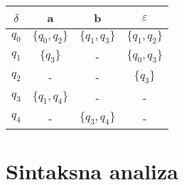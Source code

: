 \documentclass[times, 12pt, utf8]{book}
\begin{document}
\begin{enumerate}[resume]
\begin{tabular}{|c|c|c|c|} \hline

\(\delta\) & a & b & \(\varepsilon\) \\ \hline
\(q_{0}\) & \(\{q_{0}, q_{2}\}\) & \(\{q_{1}, q_{3}\}\) & \(\{q_{1}, q_{2}\}\) \\ \hline
\(q_{1}\) & \(\{q_{3}\}\) & - & \(\{q_{0}, q_{3}\}\) \\ \hline
\(q_{2}\) & - & - & \(\{q_{3}\}\) \\ \hline
\(q_{3}\) & \(\{q_{1}, q_{4}\}\) & - & - \\ \hline
\(q_{4}\) & - & \(\{q_{3}, q_{4}\}\) & - \\ \hline
\end{tabular} 

\end{enumerate}


\chapter{Sintaksna analiza}

\end{document}
